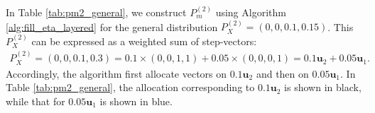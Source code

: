 \documentclass[11pt,letterpaper]{article}
\begin{document}
In Table \ref{tab:pm2_general}, we construct $P_m^{(2)}$ using Algorithm \ref{alg:fill_eta_layered} for the general distribution $P_X^{(2)} = (0,0,0.1,0.15)$. This $P_X^{(2)}$ can be expressed as a weighted sum of step-vectors:
\begin{align}
    P_X^{(2)} = (0,0,0.1,0.3) = 0.1\times(0,0,1,1) + 0.05\times(0,0,0,1) = 0.1\boldsymbol{u}_2 + 0.05\boldsymbol{u}_1.
\end{align}
Accordingly, the algorithm first allocate vectors on $0.1\boldsymbol{u}_2$ and then on $0.05\boldsymbol{u}_1$. In Table \ref{tab:pm2_general}, the allocation corresponding to $0.1\boldsymbol{u}_2$ is shown in black, while that for $0.05\boldsymbol{u}_1$ is shown in blue.

\begin{table}[]
\end{table}
\end{document}
